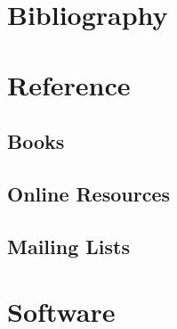 \documentclass[a4paper,12pt]{report}
\begin{document}
\section{Bibliography}

\section{Reference}

\subsection{Books}



\subsection{Online Resources}



\subsection{Mailing Lists}



\section{Software}


\end{document}
